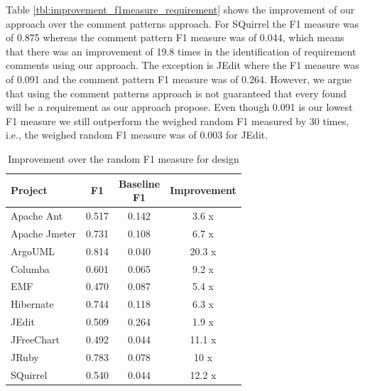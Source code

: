 Table \ref{tbl:improvement_f1measure_requirement} shows the improvement of our approach over the comment patterns approach. For SQuirrel the F1 measure was of 0.875 whereas the comment pattern F1 measure was of 0.044, which means that there was an improvement of 19.8 times in the identification of requirement \SATD comments using our approach. The exception is JEdit where the F1 measure was of 0.091 and the comment pattern F1 measure was of 0.264. However, we argue that using the comment patterns approach is not guaranteed that every \SATD found will be a requirement \SATD as our approach propose. Even though 0.091 is our lowest F1 measure we still outperform the weighed random F1 measured by 30 times, i.e., the weighed random F1 measure was of 0.003 for JEdit. 

\begin{table}[!hbt]
    \begin{center}
        \caption{Improvement over the random F1 measure for design}
        \label{tbl:improvement_f1measure_design}
        \begin{tabular}{l| c c c }
        \toprule
        \textbf{Project} & \textbf{F1} & \thead{Baseline\\F1} & \textbf{Improvement}\\
        \midrule
         Apache Ant      &  0.517 &  0.142  &  3.6  x\\
         Apache Jmeter   &  0.731 &  0.108  &  6.7  x\\
         ArgoUML         &  0.814 &  0.040  &  20.3 x\\
         Columba         &  0.601 &  0.065  &  9.2  x\\
         EMF             &  0.470 &  0.087  &  5.4  x\\
         Hibernate       &  0.744 &  0.118  &  6.3  x\\
         JEdit           &  0.509 &  0.264  &  1.9  x\\
         JFreeChart      &  0.492 &  0.044  &  11.1 x\\
         JRuby           &  0.783 &  0.078  &  10   x\\
         SQuirrel        &  0.540 &  0.044  &  12.2 x\\
        \bottomrule
        \end{tabular}
    \end{center}    
\end{table}

